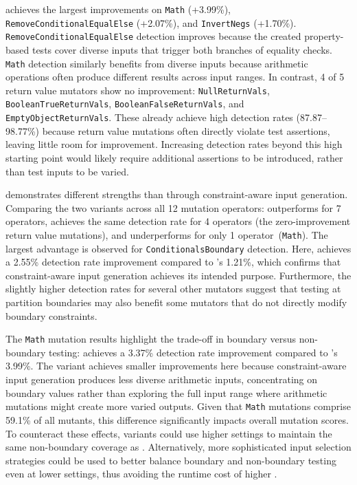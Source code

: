 \VariantNaiveC{} achieves the largest improvements on
\texttt{Math} (+3.99\%),
\texttt{Remove\-Conditional\-Equal\-Else} (+2.07\%),
and \texttt{Invert\-Negs} (+1.70\%).
\texttt{Remove\-Conditional\-Equal\-Else} detection improves because the created property-based tests
cover diverse inputs that trigger both branches of equality checks.
\texttt{Math} detection similarly benefits from diverse
inputs because arithmetic operations often produce
different results across input ranges.
In contrast, 4 of 5 return value mutators show no improvement:
\texttt{Null\-Return\-Vals}, \texttt{Boolean\-True\-Return\-Vals},
\texttt{Boolean\-False\-Return\-Vals}, and \texttt{Empty\-Object\-Return\-Vals}.
These already achieve high \VariantInitial{} detection rates (87.87--98.77\%)
because return value mutations often directly violate test assertions,
leaving little room for improvement.
Increasing detection rates beyond this high starting point
would likely require additional assertions to be introduced,
rather than test inputs to be varied.

\VariantImprovedC{} demonstrates different strengths than \VariantNaive{}
through constraint-aware input generation.
Comparing the two variants across all 12 mutation operators:
\VariantImprovedC{} outperforms \VariantNaiveC{} for 7 operators,
achieves the same detection rate for 4 operators (the zero-improvement return value mutations),
and underperforms for only 1 operator~(\texttt{Math}).
The largest advantage is observed for \texttt{Conditionals\-Boundary} detection.
Here, \VariantImprovedC{} achieves a 2.55\% detection rate improvement
compared to \VariantNaiveC{}'s 1.21\%,
which confirms that constraint-aware input generation achieves its intended purpose.
Furthermore, the slightly higher detection rates for several other mutators
suggest that testing at partition boundaries may also benefit
some mutators that do not directly modify boundary constraints.

The \texttt{Math} mutation results highlight the trade-off
in boundary versus non-boundary testing:
\VariantImprovedC{} achieves a 3.37\% detection rate improvement
compared to \VariantNaiveC{}'s 3.99\%.
The \VariantImprovedC{} variant achieves smaller improvements here
because constraint-aware input generation produces less diverse arithmetic inputs,
concentrating on boundary values rather than exploring the full input range
where arithmetic mutations might create more varied outputs.
Given that \texttt{Math} mutations comprise 59.1\% of all mutants,
this difference significantly impacts overall mutation scores.
To counteract these effects,
\VariantImproved{} variants could use higher \tries{} settings
to maintain the same non-boundary coverage as \VariantNaive{}.
Alternatively, more sophisticated input selection strategies could be used
to better balance boundary and non-boundary testing
even at lower \tries{} settings,
thus avoiding the runtime cost of higher \tries{}.

